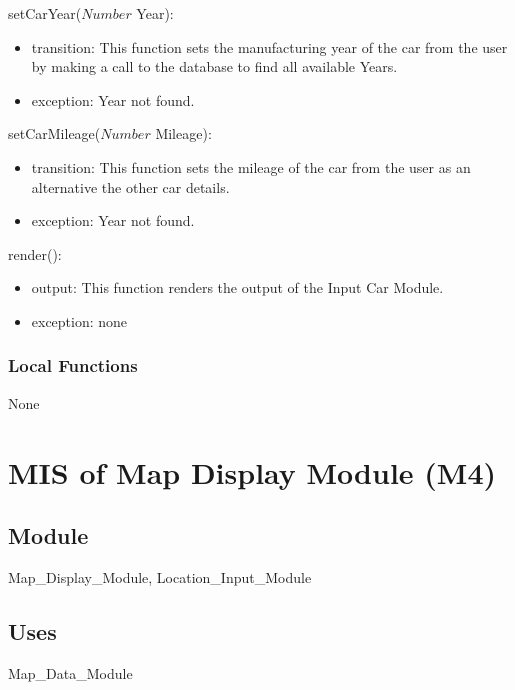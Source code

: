 \documentclass[12pt, titlepage]{article}
\begin{document}
\noindent setCarYear($Number$ Year):
\begin{itemize}
\item transition: This function sets the manufacturing year of the car from the user by making a call to the database to find all available Years.
\item exception: Year not found.
\end{itemize}

\noindent setCarMileage($Number$ Mileage):
\begin{itemize}
\item transition: This function sets the mileage of the car from the user as an alternative the other car details.
\item exception: Year not found.
\end{itemize}

\noindent render():
\begin{itemize}
\item output: This function renders the output of the Input Car Module.
\item exception: none
\end{itemize}

\subsubsection{Local Functions}

None

\newpage




\section{MIS of Map Display Module (M4)} 

\subsection{Module}

Map\_Display\_Module, Location\_Input\_Module

\subsection{Uses}

Map\_Data\_Module
\end{document}
